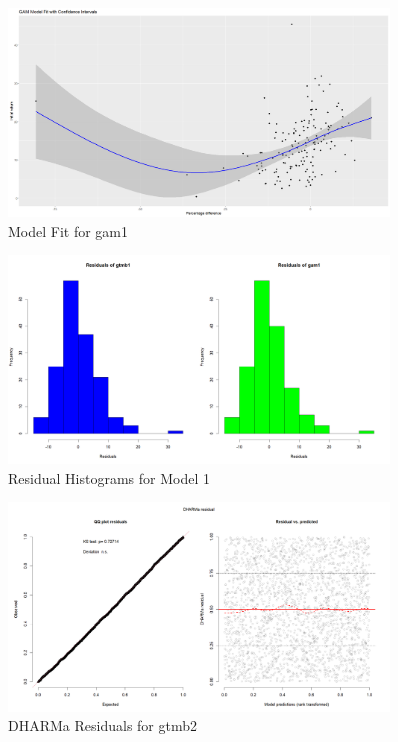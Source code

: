 \begin{figure}[h]
    \centering
    \includegraphics[width=0.9\textwidth]{visuals/modelfit_gam1.png}
    \caption{Model Fit for gam1 }
    \label{fig:modfitgtmb1}
\end{figure}

\begin{figure}[h]
    \centering
    \includegraphics[width=0.9\textwidth]{visuals/residualhists_1.png}
    \caption{Residual Histograms for Model 1}
    \label{fig:residualhists1}
\end{figure}

\begin{figure}[h]
    \centering
    \includegraphics[width=0.9\textwidth]{visuals/DHARMa_gtmb2.png}
    \caption{DHARMa Residuals for gtmb2}
    \label{fig:dharmagtmb2}
\end{figure}

